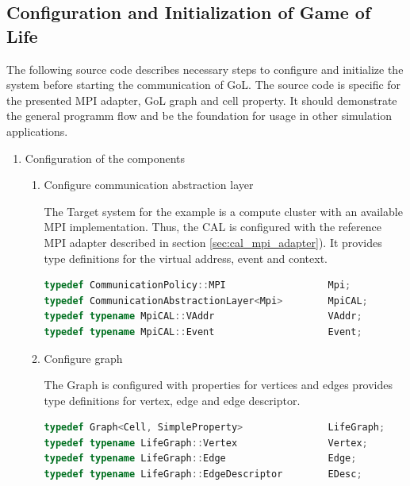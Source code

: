 \subsection{Configuration and Initialization of Game of Life}
The following source code describes necessary steps to configure and
initialize the system before starting the communication of GoL. The
source code is specific for the presented MPI adapter, GoL graph and
cell property. It should demonstrate the general programm flow and be
the foundation for usage in other simulation applications.

\begin{enumerate}

\item Configuration of the components
\begin{enumerate}

\item Configure communication abstraction layer
  
  The Target system for the example is a compute cluster with an
  available MPI implementation. Thus, the CAL is configured with the
  reference MPI adapter described in section
  \ref{sec:cal_mpi_adapter}). It provides type definitions for the
  virtual address, event and context.

  \begin{lstlisting}[language=C++, label=lst:conf_cal]
typedef CommunicationPolicy::MPI                  Mpi;
typedef CommunicationAbstractionLayer<Mpi>        MpiCAL;
typedef typename MpiCAL::VAddr                    VAddr;
typedef typename MpiCAL::Event                    Event;
  \end{lstlisting}

\item Configure graph

  The Graph is configured with properties for vertices  and
  edges  provides type definitions for vertex, edge and
  edge descriptor. 

  \begin{lstlisting}[language=C++, label=lst:conf_graph]
typedef Graph<Cell, SimpleProperty>               LifeGraph;
typedef typename LifeGraph::Vertex                Vertex;
typedef typename LifeGraph::Edge                  Edge;
typedef typename LifeGraph::EdgeDescriptor        EDesc;
  \end{lstlisting}




\end{enumerate}
\end{enumerate}
